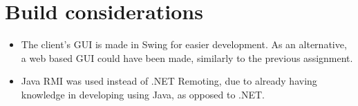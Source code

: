 \documentclass[a4paper,10pt]{report}
\begin{document}
\section{Build considerations}
\begin{itemize}
    \item The client's GUI is made in Swing for easier development. As an alternative, a web based GUI could have been made, similarly to the previous assignment.
    \item Java RMI was used instead of .NET Remoting, due to already having knowledge in developing using Java, as opposed to .NET.
\end{itemize}
\end{document}
